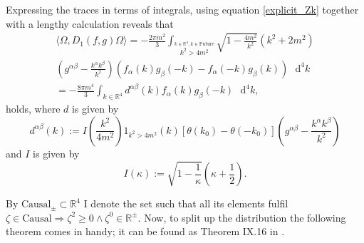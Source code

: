 \documentclass[b5paper,draft,openbib,12pt]{memoir}
\begin{document}
Expressing the traces in terms of integrals, using equation \eqref{explicit_Zk} together with a lengthy calculation reveals that 
\begin{multline}\label{D1_vacc}
\langle \Omega, D_1(f,g) \Omega \rangle
=-\frac{2\pi m^2}{3} \int_{\stackrel{k\in\mathbb{R}^4, k\in\text{Future}}{k^2>4m^2}} \sqrt{1-\frac{4m^2}{k^2}}(k^2+2m^2) \\
(g^{\alpha \beta}-\frac{k^\alpha k^\beta}{k^2})\left(f_\alpha (k) g_\beta (-k) - f_\alpha (-k) g_\beta (k)\right) \text{ }\mathrm{d}^4k\\
=-\frac{8 \pi m^4}{3} \int_{k\in\mathbb{R}^4}  d^{\alpha \beta}(k) f_\alpha(k) g_\beta (-k)\text{ }\mathrm{d}^4k,
\end{multline}
holds, where \(d\) is given by
\begin{equation}
d^{\alpha \beta}(k):= I\left( \frac{k^2}{4m^2}\right) 1_{k^2>4m^2}(k) [\theta (k_0)- \theta (-k_0)] \left(g^{\alpha \beta}-\frac{k^\alpha k^\beta}{k^2}\right)
\end{equation}
and \(I\) is given by
\begin{equation}
I(\kappa):=\sqrt{1-\frac{1}{\kappa}}\left(\kappa +\frac{1}{2}\right).
\end{equation}

By \(\text{Causal}_{\pm}\subset \mathbb{R}^4\) I denote the set such that all its elements fulfil \(\zeta\in \text{Causal} \Rightarrow \zeta^2\ge 0\wedge \zeta^0 \in \mathbb{R}^{\pm}\).
Now, to split up the distribution the following theorem comes in handy; it can be found as Theorem IX.16 in \cite{reed1975methods}.
\end{document}

